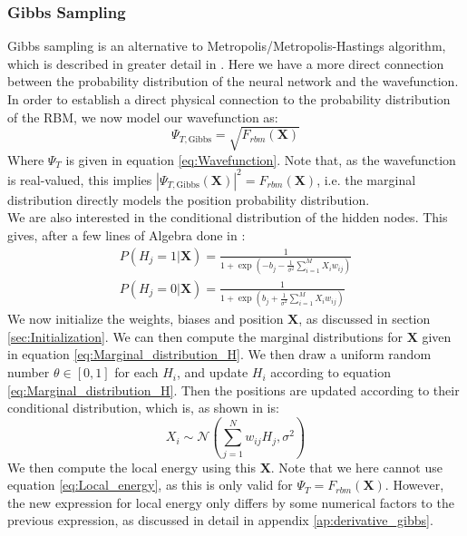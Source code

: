 \documentclass[a4paper, 10pt]{article}
\begin{document}
	\subsubsection{Gibbs Sampling}
	Gibbs sampling is an alternative to Metropolis/Metropolis-Hastings algorithm, which is described in greater detail in \cite{Wang2014}. Here we have a more direct connection between the probability distribution of the neural network and the wavefunction. In order to establish a direct physical connection to the probability distribution of the RBM, we now model our wavefunction as:
	\begin{equation}\label{eq:wavefunction_Gibbs}
	\Psi_{T, \mathrm{Gibbs}} =\sqrt{F_{rbm}(\boldsymbol{X})}
	\end{equation}
	Where $\Psi_T$ is given in equation \ref{eq:Wavefunction}. Note that, as the wavefunction is real-valued, this implies $|\Psi_{T, \mathrm{Gibbs}}(\boldsymbol{X})|^2 = F_{rbm}(\boldsymbol{X})$, i.e. the marginal distribution directly models the position probability distribution.\\
	\linebreak
	We are also interested in the conditional distribution of the hidden nodes. This gives, after a few lines of Algebra done in \cite{Hjorth-Jensen2018}:
	\begin{equation}\label{eq:Marginal_distribution_H}
	\begin{split}
	P(H_j=1|\boldsymbol{X})=\frac{1}{1+\exp\left(-b_j-\frac{1}{\sigma^2}\sum_{i=1}^M X_i w_{ij}\right)}\\
	P(H_j=0|\boldsymbol{X})=\frac{1}{1+\exp\left(b_j+\frac{1}{\sigma^2}\sum_{i=1}^M X_i w_{ij}\right)}
	\end{split}
	\end{equation}
	We now initialize the weights, biases and position $\boldsymbol{X}$, as discussed in section \ref{sec:Initialization}. We can then compute the marginal distributions for $\boldsymbol{X}$ given in equation \ref{eq:Marginal_distribution_H}. We then draw a uniform random number $\theta \in [0,1]$ for each $H_i$, and update $H_i$ according to equation \ref{eq:Marginal_distribution_H}. Then the positions are updated according to their conditional distribution, which is, as shown in \cite{Hjorth-Jensen2018} is:
	\begin{equation}
	X_i\sim \mathcal{N}\left(\sum_{j=1}^Nw_{ij}H_j, \sigma^2\right)
	\end{equation}
	We then compute the local energy using this $\boldsymbol{X}$. Note that we here cannot use equation \ref{eq:Local_energy}, as this is only valid for $\Psi_T = F_{rbm}(\boldsymbol{X})$. However, the new expression for local energy only differs by some numerical factors to the previous expression, as discussed in detail in appendix \ref{ap:derivative_gibbs}. 
\end{document}

